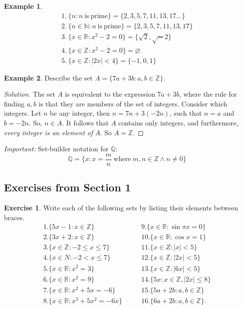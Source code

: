 \documentclass{article}
\theoremstyle{definition}
\newtheorem{example}{Example}[subsection]
\newtheorem{exercise}{Exercise}[section]
\newcommand{\R}{\mathbb{R}}
\newcommand{\Z}{\mathbb{Z}}
\newenvironment{solution}
    {\begin{proof}[Solution]}
    {\end{proof}}
\begin{document}
\begin{example}
    
$$
\begin{aligned}
1.~ \{ n:n~\mathrm{is~prime} \} = \{ 2,3,5,7,11,13,17... \}\\
2.~ \{ n\in\mathbb{N}: n\mathrm{~is~prime} \} = \{ 2,3,5,7,11,13,17 \}\\
3.~ \{ x\in\mathbb{R}: x^2-2=0 \} = \{ \sqrt2,\sqrt-2 \}\\
4.~ \{ x\in\mathbb{Z}:x^2-2=0 \} = \varnothing\\
5.~ \{ x\in\mathbb{Z}: |2x|<4 \} = \{ -1,0,1 \}
\end{aligned}
$$
\end{example}

\begin{example}
Describe the set $A=\{ 7a+3b: a,b\in\mathbb{Z} \}$. 
\begin{solution}
The set $A$ is equivalent to the expression $7a+3b$, where the rule for finding $a,b$ is that they are members of the set of integers. Consider which integers. Let $n$ be any integer, then $n=7n+3(-2n)$, such that $n=a$ and $b=-2n$. So, $n\in A$. It follows that $A$ contains only integers, and furthermore, \emph{every integer is an element of} $A$. So $A=\mathbb{Z}$.    
\end{solution}  
\end{example}


\emph{Important:} Set-builder notation for $\mathbb{Q}$: 
$$
\mathbb{Q} = \{ x: x = \frac {m}{n} \mathrm{~where~}m,n\in\mathbb{Z}\land n\neq 0 \}
$$

\subsection{Exercises from Section 1}
\begin{exercise}
    Write each of the following sets by listing their elements between braces. 
    $$
    \begin{aligned}
    1. \{ 5x-1:x\in\Z \} &\quad\quad 9. \{ x\in\R:\sin\pi x=0 \}\\
    2. \{ 3x+2:x\in\Z \} &\quad\quad 10. \{ x\in\R:\cos x=1 \}\\
    3. \{ x\in\Z:-2\le x\le 7 \} &\quad\quad 11. \{ x\in Z:\lvert x \rvert < 5 \}\\
    4. \{ x\in N: -2 < x \le 7\} &\quad\quad 12. \{ x\in\Z: \lvert 2x \rvert<5 \}\\
    5. \{ x\in\R:x^2=3 \} &\quad\quad 13. \{ x\in\Z:\lvert 6x \rvert < 5 \}\\
    6. \{ x\in\R:x^2=9 \} &\quad\quad 14. \{ 5x:x\in\Z,\lvert 2x \rvert\le 8 \}\\
    7. \{ x\in\R:x^2+5x=-6 \} &\quad\quad 15. \{ 5a+2b:a,b\in\Z \}\\
    8. \{ x\in\R:x^3+5x^2=-6x \} &\quad\quad 16. \{ 6a+2b:a,b\in\Z \}.
    \end{aligned}
    $$
\end{exercise}
\end{document}
